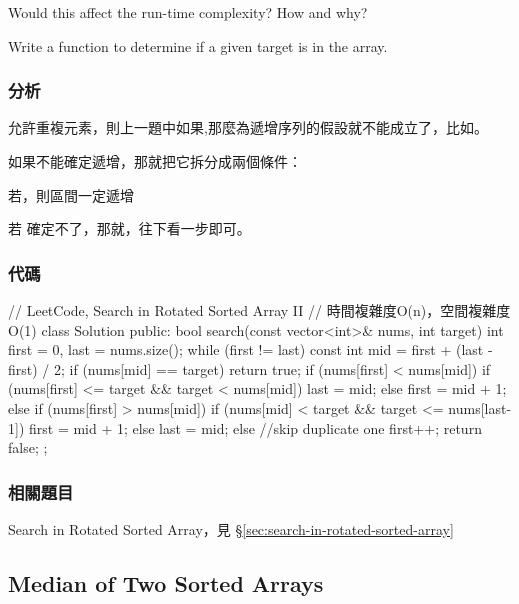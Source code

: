 Would this affect the run-time complexity? How and why?

Write a function to determine if a given target is in the array.


\subsubsection{分析}
允許重複元素，則上一題中如果,那麼\fn{[l,m]}為遞增序列的假設就不能成立了，比如\code{\[1,3,1,1,1\]}。

如果不能確定遞增，那就把它拆分成兩個條件：
\begindot
\item 若，則區間\fn{[l,m]}一定遞增
\item 若 確定不了，那就，往下看一步即可。
\myenddot

\subsubsection{代碼}
\begin{Code}
// LeetCode, Search in Rotated Sorted Array II
// 時間複雜度O(n)，空間複雜度O(1)
class Solution {
public:
    bool search(const vector<int>& nums, int target) {
        int first = 0, last = nums.size();
        while (first != last) {
            const int mid = first  + (last - first) / 2;
            if (nums[mid] == target)
                return true;
            if (nums[first] < nums[mid]) {
                if (nums[first] <= target && target < nums[mid])
                    last = mid;
                else
                    first = mid + 1;
            } else if (nums[first] > nums[mid]) {
                if (nums[mid] < target && target <= nums[last-1])
                    first = mid + 1;
                else
                    last = mid;
            } else
                //skip duplicate one
                first++;
        }
        return false;
    }
};
\end{Code}


\subsubsection{相關題目}

\begindot
\item Search in Rotated Sorted Array，見 \S \ref{sec:search-in-rotated-sorted-array}
\myenddot


\subsection{Median of Two Sorted Arrays}
\label{sec:median-of-two-sorted-arrays}



